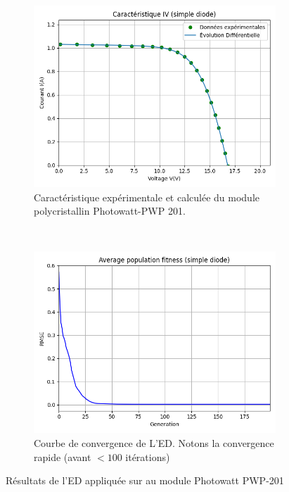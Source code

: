 \begin{figure}[t!]
    \centering
    \begin{subfigure}[b]{0.45\textwidth}
        \includegraphics[width=\textwidth]{resources/pwp/iv.png}
        \caption{Caractéristique expérimentale et calculée du module polycristallin Photowatt-PWP 201.}
    \end{subfigure}
    ~
    \begin{subfigure}[b]{0.45\textwidth}
        \includegraphics[width=\textwidth]{resources/pwp/fitness.png}
        \caption{Courbe de convergence de L'ED. Notons la convergence rapide (avant $< 100$ itérations)}
    \end{subfigure}
    \caption{Résultats de l'ED appliquée sur au module Photowatt PWP-201}
    \label{fig:pwpsingle}
\end{figure}

